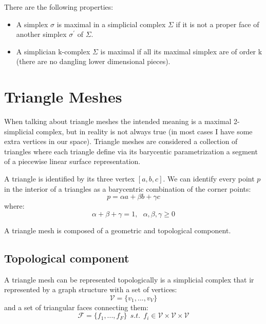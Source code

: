 There are the following properties:
\begin{itemize}
    \item A simplex $\sigma$ is maximal in a simplicial complex $\Sigma$ if it is not a proper face of another simplex $\sigma^{'}$ of $\Sigma$.
    \item A simplician k-complex $\Sigma$ is maximal if all its maximal simplex are of order k (there are no dangling lower dimensional pieces).
\end{itemize}

\section{Triangle Meshes}
When talking about triangle meshes the intended meaning is a maximal 2-simplicial complex, but in reality is not always true (in most cases I have some extra vertices in our space). Triangle meshes are considered a collection of triangles where each triangle define via its barycentic parametrization a segment of a piecewise linear surface representation.\par
A triangle is identified by its three vertex $[a,b,c]$. We can identify every point $p$ in the interior of a triangles as a barycentric combination of the corner points:
\begin{equation*}
    p = \alpha a + \beta b + \gamma c
\end{equation*}
where:
\begin{equation*}
    \alpha + \beta + \gamma = 1, \ \ \ \alpha,\beta,\gamma \geq 0
\end{equation*}

A triangle mesh is composed of a geometric and topological component.

\subsection{Topological component}
A triangle mesh can be represented topologically is a simplicial complex that ir represented by a graph structure with a set of vertices:
\begin{equation*}
    \mathcal{V} = \{v_{1}, ..., v_{V}\}    
\end{equation*}
 and a set of triangular faces connecting them:
 \begin{equation*}
     \mathcal{F} = \{f_{1}, ..., f_{F}\} \ \ s.t. \ \ f_{i} \in \mathcal{V} \times \mathcal{V} \times \mathcal{V}
 \end{equation*}

